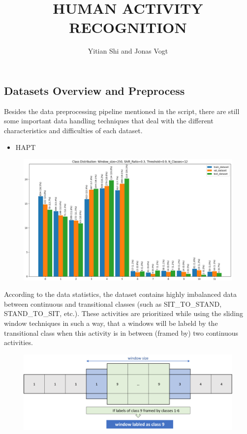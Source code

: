 \documentclass[landscape,a3,final,24pt]{issposter}
\title{\MakeUppercase{Human Activity Recognition}}
\author{Yitian Shi and Jonas Vogt}
\institute{Institute of Signal Processing and System Theory, University of Stuttgart, Germany}
\begin{document}
\maketitle

\raggedright

\begin{multicols}{3}
\section{Datasets Overview and Preprocess }
Besides the data preprocessing pipeline mentioned in the script, there are still some important data handling techniques that deal with the different characteristics and difficulties of each dataset.
\begin{itemize}\item HAPT\end{itemize}
\begin{figure}
\centering
\includegraphics[scale=0.27]{Pictures/HAPT_class_distribution.png}
\end{figure}

According to the data statistics, the dataset contains highly imbalanced data between continuous and transitional classes (such as SIT\_TO\_STAND, STAND\_TO\_SIT, etc.). These activities are prioritized while using the sliding window techniques in such a way, that a windows will be labeld by the transitional class when this activity is in between (framed by) two continuous activities.

\begin{figure}
\centering
\includegraphics[scale=0.55]{Pictures/sliding Window_prio.png}
\end{figure}


\end{multicols}
\end{document}
